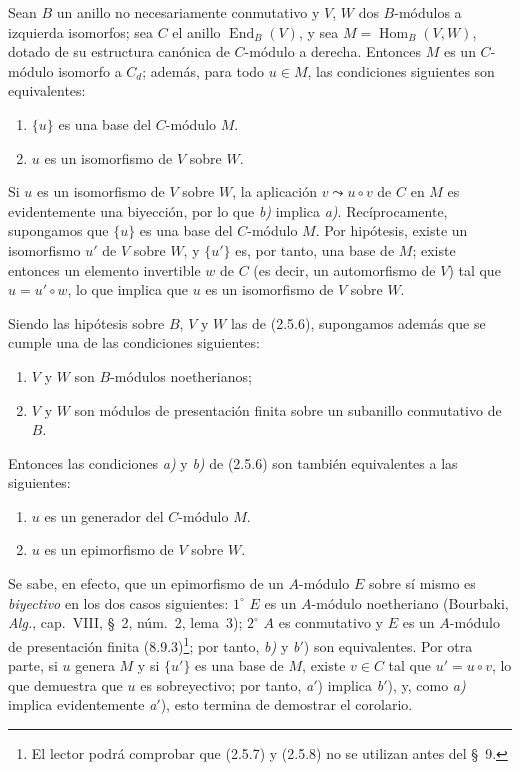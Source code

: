 \begin{lemma}[2.5.6]
\label{IV.2.5.6-fr}
Sean $B$ un anillo no necesariamente conmutativo y $V$, $W$ dos
$B$-módulos a izquierda isomorfos; sea $C$ el anillo
$\operatorname{End}_B(V)$, y sea
$M=\operatorname{Hom}_B(V,W)$, dotado de su estructura canónica de
$C$-módulo a derecha. Entonces $M$ es un $C$-módulo isomorfo a $C_d$; además,
para todo $u\in M$, las condiciones siguientes son equivalentes:
\begin{enumerate}
\item[\emph{a)}] $\{u\}$ es una base del $C$-módulo $M$.
\item[\emph{b)}] $u$ es un isomorfismo de $V$ sobre $W$.
\end{enumerate}
\end{lemma}

Si $u$ es un isomorfismo de $V$ sobre $W$, la aplicación
$v\leadsto u\circ v$ de $C$ en $M$ es evidentemente una biyección, por lo que
\emph{b)} implica \emph{a)}. Recíprocamente, supongamos que $\{u\}$ es una
base del $C$-módulo $M$. Por hipótesis, existe un isomorfismo $u'$ de $V$
sobre $W$, y $\{u'\}$ es, por tanto, una base de $M$; existe entonces un
elemento invertible $w$ de $C$ (es decir, un automorfismo de $V$) tal que
$u=u'\circ w$, lo que implica que $u$ es un isomorfismo de $V$ sobre $W$.

\begin{corollary}[2.5.7]
\label{IV.2.5.7-fr}
Siendo las hipótesis sobre $B$, $V$ y $W$ las de \textup{(2.5.6)}, supongamos además
que se cumple una de las condiciones siguientes:
\begin{enumerate}
\item[\textup{(i)}] $V$ y $W$ son $B$-módulos noetherianos;
\item[\textup{(ii)}] $V$ y $W$ son módulos de presentación finita sobre un subanillo
conmutativo de $B$.
\end{enumerate}
Entonces las condiciones \emph{a)} y \emph{b)} de \textup{(2.5.6)} son también
equivalentes a las siguientes:
\begin{enumerate}
\item[\emph{a}$'$)] $u$ es un generador del $C$-módulo $M$.
\item[\emph{b}$'$)] $u$ es un epimorfismo de $V$ sobre $W$.
\end{enumerate}
\end{corollary}

Se sabe, en efecto, que un epimorfismo de un $A$-módulo $E$ sobre sí mismo es
\emph{biyectivo} en los dos casos siguientes: $1^\circ$ $E$ es un $A$-módulo
noetheriano (Bourbaki, \emph{Alg.}, cap.~VIII, \S~2,
núm.~2, lema~3); $2^\circ$ $A$ es conmutativo y $E$ es un
$A$-módulo de presentación finita (8.9.3)\footnote{El lector podrá comprobar
que (2.5.7) y
(2.5.8) no se utilizan antes del \S~9.}; por tanto, \emph{b)} y
\emph{b}$'$) son equivalentes. Por otra parte, si $u$ genera $M$
y si $\{u'\}$ es una base de $M$, existe $v\in C$ tal que
$u'=u\circ v$, lo que demuestra que $u$ es sobreyectivo; por tanto,
\emph{a}$'$) implica \emph{b}$'$), y, como \emph{a)} implica evidentemente
\emph{a}$'$), esto termina de demostrar el corolario.
